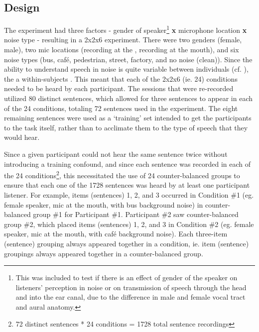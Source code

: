 \subsection{Design}
\label{chap3:methods:design}

The experiment had three factors - gender of speaker\footnote{This was included to test if there is an effect of gender of the speaker on listeners' perception in noise or on transmission of speech through the head and into the ear canal, due to the difference in male and female vocal tract and aural anatomy.} \textbf{x} microphone location \textbf{x} noise type - resulting in a 2x2x6 experiment.  There were two genders (female, male), two mic locations (recording at the \DIFdelbegin {}\DIFdelend \DIFaddbegin {}\DIFaddend , recording at the mouth), and six noise types (bus, caf\'{e}, pedestrian, street, factory, and no noise (clean)).  Since the ability to understand speech in noise is quite variable between individuals (cf. \cite{ding:13,gilbert:13}), the \DIFdelbegin {}\DIFdelend \DIFaddbegin {}\DIFaddend a within-subjects \DIFdelbegin {}\DIFdelend \DIFaddbegin {}\DIFaddend .  This meant that each of the 2x2x6 (ie. 24) conditions needed to be heard by each participant.  The sessions that were re-recorded utilized 80 distinct sentences, which allowed for three sentences to appear in each of the 24 conditions, totaling 72 sentences used in the experiment.  The eight remaining sentences were used as a `training' set intended to get the participants \DIFdelbegin {}\DIFdelend \DIFaddbegin {}\DIFaddend to the task itself, rather than to acclimate them to the type of speech that they would hear.

Since a given participant could not hear the same sentence twice without introducing a training confound, and since each sentence was recorded in each of the 24 conditions\footnote{72 distinct sentences * 24 conditions = 1728 total sentence recordings}, this necessitated the use of 24 counter-balanced groups to ensure that each one of the 1728 sentences was heard by at least one participant listener.  For example, items (sentences) 1, 2, and 3 occurred in Condition \#1 (eg. female speaker, mic at the mouth, with bus background noise) in counter-balanced group \#1 for Participant \#1. Participant \#2 saw counter-balanced group \#2, which placed items (sentences) 1, 2, and 3 in Condition \#2 (eg. female speaker, mic at the mouth, with caf\'{e} background noise).  Each three-item (sentence) grouping always appeared together in a condition, ie. item (sentence) groupings always appeared together in a counter-balanced group.  

